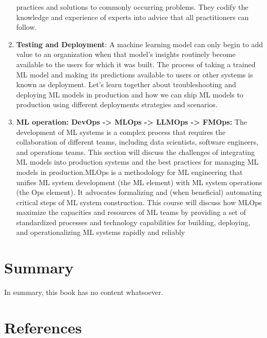 \documentclass[
  letterpaper,
  DIV=11,
  numbers=noendperiod]{scrreprt}
\newlength{\cslhangindent}
\newenvironment{CSLReferences}[2] %
 {\begin{list}{}{%
  \setlength{\itemindent}{0pt}
  \setlength{\leftmargin}{0pt}
  \setlength{\parsep}{0pt}
  \ifodd #1
   \setlength{\leftmargin}{\cslhangindent}
   \setlength{\itemindent}{-1\cslhangindent}
  \fi
  \setlength{\itemsep}{#2\baselineskip}}}
 {\end{list}}
\begin{document}
\begin{enumerate}
  practices and solutions to commonly occurring problems. They codify
  the knowledge and experience of experts into advice that all
  practitioners can follow.
\item
  \textbf{Testing and Deployment}: A machine learning model can only
  begin to add value to an organization when that model's insights
  routinely become available to the users for which it was built. The
  process of taking a trained ML model and making its predictions
  available to users or other systems is known as deployment. Let's
  learn together about troubleshooting and deploying ML models in
  production and how we can ship ML models to production using different
  deployments strategies and scenarios.
\item
  \textbf{ML operation: DevOps -\textgreater{} MLOps -\textgreater{}
  LLMOps -\textgreater{} FMOps:} The development of ML systems is a
  complex process that requires the collaboration of different teams,
  including data scientists, software engineers, and operations teams.
  This section will discuss the challenges of integrating ML models into
  production systems and the best practices for managing ML models in
  production.MLOps is a methodology for ML engineering that unifies ML
  system development (the ML element) with ML system operations (the Ops
  element). It advocates formalizing and (when beneficial) automating
  critical steps of ML system construction. This course will discuss how
  MLOps maximize the capacities and resources of ML teams by providing a
  set of standardized processes and technology capabilities for
  building, deploying, and operationalizing ML systems rapidly and
  reliably
\end{enumerate}


\chapter{Summary}\label{summary}

In summary, this book has no content whatsoever.


\chapter*{References}\label{references}


\label{refs}
\begin{CSLReferences}{0}{1}
\end{CSLReferences}
\end{document}
